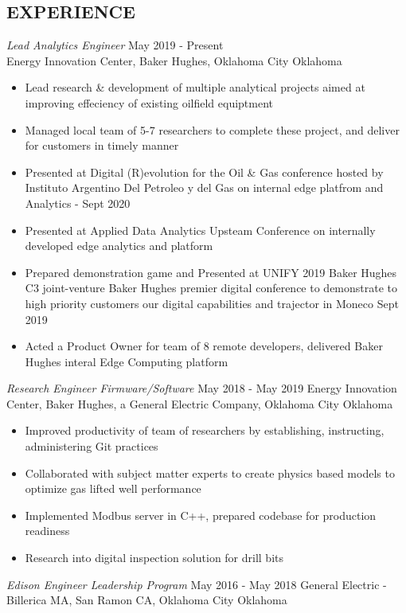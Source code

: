 \documentclass[line,margin]{res}
\begin{document}
\begin{resume}
	\section{EXPERIENCE}
	 {\sl Lead Analytics Engineer} \hfill May 2019 - Present \\
	Energy Innovation Center, Baker Hughes, Oklahoma City Oklahoma
	\begin{itemize} \itemsep -2pt
		\item Lead research \& development of multiple analytical projects aimed at improving effeciency of existing oilfield equiptment
		\item Managed local team of 5-7 researchers to complete these project, and deliver for customers in timely manner
		\item Presented at Digital (R)evolution for the Oil \& Gas conference hosted by Instituto Argentino Del Petroleo y del Gas on internal edge platfrom and Analytics - Sept 2020
		\item Presented at  Applied Data Analytics Upsteam Conference on internally developed edge analytics and platform
		\item Prepared demonstration game and Presented at UNIFY 2019 Baker Hughes C3 joint-venture Baker Hughes premier digital conference to demonstrate to high priority customers our digital capabilities and trajector in Moneco Sept 2019
		\item Acted a Product Owner for team of 8 remote developers, delivered Baker Hughes interal Edge Computing platform
	\end{itemize}
	{\sl Research Engineer Firmware/Software} \hfill May 2018 - May 2019
	Energy Innovation Center, Baker Hughes, a General Electric Company, Oklahoma City Oklahoma
	\begin{itemize} \itemsep -2pt
		\item Improved productivity of team of researchers by establishing, instructing, administering Git practices
		\item Collaborated with subject matter experts to create physics based models to optimize gas lifted well performance
		\item Implemented Modbus server in C++, prepared codebase for production readiness
		\item Research into digital inspection solution for drill bits
	\end{itemize}
	{\sl Edison Engineer Leadership Program} \hfill May 2016 - May 2018
	General Electric - Billerica MA, San Ramon CA, Oklahoma City Oklahoma
	\begin{itemize} \itemsep -2pt

\end{itemize}
\end{resume}
\end{document}
